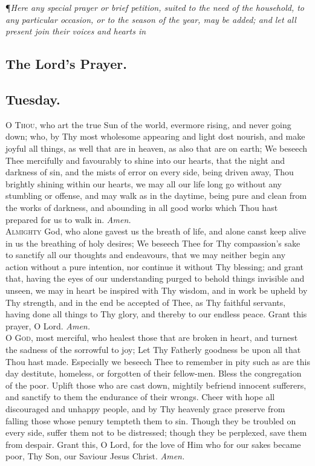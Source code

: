 \noindent\P\textit{Here any special prayer or brief petition, suited to the need of the
household, to any particular occasion, or to the season of the
year, may be added; and let all present join their voices and
hearts in}

\subsection*{The Lord's Prayer.}

\subsection*{Tuesday.} 

\lettrine{O}{ Thou,} who art the true Sun of the world, evermore rising, and never going down; who, by Thy most wholesome appearing and light dost nourish, and make joyful all
things, as well that are in heaven, as also that are on earth;
We beseech Thee mercifully and favourably to shine into
our hearts, that the night and darkness of sin, and the
mists of error on every side, being driven away, Thou
brightly shining within our hearts, we may all our life
long go without any stumbling or offense, and may walk
as in the daytime, being pure and clean from the works
of darkness, and abounding in all good works which Thou
hast prepared for us to walk in.
\textit{Amen.} \\

\lettrine{A}{lmighty} God, who alone gavest us the breath of life,
and alone canst keep alive in us the breathing of holy
desires; We beseech Thee for Thy compassion's sake to
sanctify all our thoughts and endeavours, that we may
neither begin any action without a pure intention, nor continue it without Thy blessing; and grant that, having the
eyes of our understanding purged to behold things invisible and unseen, we may in heart be inspired with Thy
wisdom, and in work be upheld by Thy strength, and in
the end be accepted of Thee, as Thy faithful servants,
having done all things to Thy glory, and thereby to our
endless peace. Grant this prayer, O Lord.
\textit{Amen.} \\

\lettrine{O}{ God,} most merciful, who healest those that are broken
in heart, and turnest the sadness of the sorrowful to
joy; Let Thy Fatherly goodness be upon all that Thou hast
made. Especially we beseech Thee to remember in pity
such as are this day destitute, homeless, or forgotten of their
fellow-men. Bless the congregation of the poor. Uplift
those who are cast down, mightily befriend innocent sufferers, and sanctify to them the endurance of their wrongs.
Cheer with hope all discouraged and unhappy people, and
by Thy heavenly grace preserve from falling those whose
penury tempteth them to sin. Though they be troubled
on every side, suffer them not to be distressed; though
they be perplexed, save them from despair. Grant this,
O Lord, for the love of Him who for our sakes became
poor, Thy Son, our Saviour Jesus Christ.
\textit{Amen.} \\ \\

